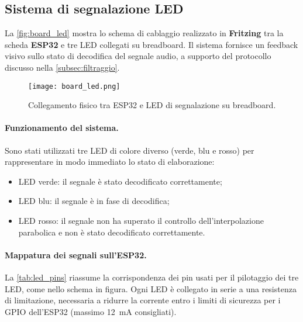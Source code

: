 \subsection{Sistema di segnalazione LED}
\label{subsec:led_system}

La \autoref{fig:board_led} mostra lo schema di cablaggio realizzato in \textbf{Fritzing} tra la scheda \textbf{ESP32} e tre LED collegati su breadboard.  
Il sistema fornisce un feedback visivo sullo stato di decodifica del segnale audio, a supporto del protocollo discusso nella \autoref{subsec:filtraggio}.  

\begin{figure}[H]
  \centering
  \texttt{[image: board\_led.png]}
  \caption{Collegamento fisico tra ESP32 e LED di segnalazione su breadboard.}
  \label{fig:board_led}
\end{figure} 

\paragraph{Funzionamento del sistema.}
Sono stati utilizzati tre LED di colore diverso (verde, blu e rosso) per rappresentare in modo immediato lo stato di elaborazione:  
\begin{itemize}
  \item LED verde: il segnale è stato decodificato correttamente;
  \item LED blu: il segnale è in fase di decodifica;
  \item LED rosso: il segnale non ha superato il controllo dell’interpolazione parabolica e non è stato decodificato correttamente.
\end{itemize}

\paragraph{Mappatura dei segnali sull'ESP32.}
La \autoref{tab:led_pins} riassume la corrispondenza dei pin usati per il pilotaggio dei tre LED, come nello schema in figura.  
Ogni LED è collegato in serie a una resistenza di limitazione, necessaria a ridurre la corrente entro i limiti di sicurezza per i GPIO dell’ESP32 (massimo \SI{12}{mA} consigliati).


